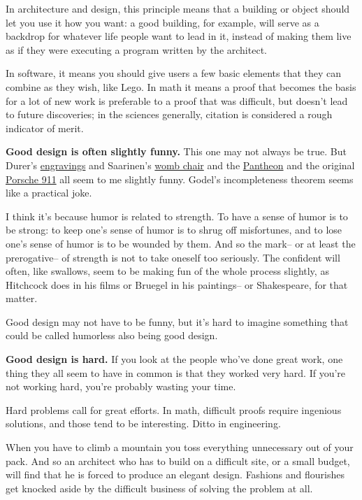 \documentclass[12pt]{book}
\begin{document}
In architecture and design, this principle means that a building or
object should let you use it how you want: a good building, for example,
will serve as a backdrop for whatever life people want to lead in it,
instead of making them live as if they were executing a program written
by the architect.

In software, it means you should give users a few basic elements that
they can combine as they wish, like Lego. In math it means a proof that
becomes the basis for a lot of new work is preferable to a proof that
was difficult, but doesn't lead to future discoveries; in the sciences
generally, citation is considered a rough indicator of merit.

\textbf{Good design is often slightly funny.} This one may not always be
true. But Durer's \href{pilate.html}{engravings} and Saarinen's
\href{womb.html}{womb chair} and the \href{pantheon.html}{Pantheon} and
the original \href{1974-911s.html}{Porsche 911} all seem to me slightly
funny. Godel's incompleteness theorem seems like a practical joke.

I think it's because humor is related to strength. To have a sense of
humor is to be strong: to keep one's sense of humor is to shrug off
misfortunes, and to lose one's sense of humor is to be wounded by them.
And so the mark-- or at least the prerogative-- of strength is not to
take oneself too seriously. The confident will often, like swallows,
seem to be making fun of the whole process slightly, as Hitchcock does
in his films or Bruegel in his paintings-- or Shakespeare, for that
matter.

Good design may not have to be funny, but it's hard to imagine something
that could be called humorless also being good design.

\textbf{Good design is hard.} If you look at the people who've done
great work, one thing they all seem to have in common is that they
worked very hard. If you're not working hard, you're probably wasting
your time.

Hard problems call for great efforts. In math, difficult proofs require
ingenious solutions, and those tend to be interesting. Ditto in
engineering.

When you have to climb a mountain you toss everything unnecessary out of
your pack. And so an architect who has to build on a difficult site, or
a small budget, will find that he is forced to produce an elegant
design. Fashions and flourishes get knocked aside by the difficult
business of solving the problem at all.
\end{document}
